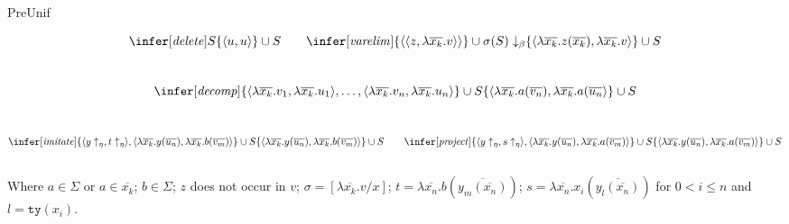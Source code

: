 \calculusAcronym{}    





\maketitle

\begin{entry}{PreUnif}



\newcommand{\upair}[2]{\langle#1, #2\rangle}
\newcommand{\spair}[2]{\langle\langle#1, #2\rangle\rangle}
\newcommand{\vco}[2]{#1_1,\ldots,#1_{#2}}
\newcommand{\vc}[2]{\overline{#1_{#2}}}

\begin{calculus}


\[
\infer[\mathit{delete}] {S}
               {\{\upair u u\} \cup S}
\qquad
\infer[\mathit{varelim}]{\{\spair z {{\lambda \vc x k}.v}\} \cup \sigma(S)\downarrow_\beta}
               {\{\upair {{\lambda\vc x k.z(\vc x k)}} {\lambda\vc x k.v}\} \cup S}
\]\\[-1em]
\[
\infer[\mathit{decomp}] {\{\upair {{\lambda\vc x k}.v_1} {{\lambda\vc x k}.u_1} ,\ldots,
                  \upair {{\lambda\vc x k}.v_n} {{\lambda\vc x k}.u_n}\}  \cup S}
               {\{\upair {{\lambda\vc x k}.a(\vc v n)}
                         {{\lambda\vc x k}.a(\vc u n}\} \cup S}
\]\\[-1em]
\[
\infer[\mathit{imitate}]{\{\upair {y\uparrow_\eta} {t\uparrow_\eta}, \upair {\lambda\vc x k.y(\vc u n)}
                 {\lambda\vc x k.b(\vc v m)}\} \cup S}
               {\{\upair {\lambda\vc x k.y(\vc u n)}
               {\lambda\vc x k.b(\vc v m)}\} \cup S}
\qquad
\infer[\mathit{project}]{\{\upair {y\uparrow_\eta} {s\uparrow_\eta}, \upair {\lambda\vc x k.y(\vc u n)}
                 {\lambda\vc x k.a(\vc v m)}\} \cup S}
               {\{\upair {\lambda\vc x k.y(\vc u n)}
               {\lambda\vc x k.a(\vc v m)}\} \cup S}
\]\\
Where $a\in\Sigma$ or $a\in{\vc x k}$; $b\in\Sigma$; $z$ does not occur in $v$;
$\sigma = [\lambda\vc x k.v/x]$; $t = \lambda\vc x n.b(\overline{y_m(\vc x n)})$;
$s = \lambda\vc x n.x_i(\overline{y_l(\vc x n)})$ for $0<i\leq n$ and $l = \texttt{ty}(x_i)$.
\end{calculus}


\end{entry}
